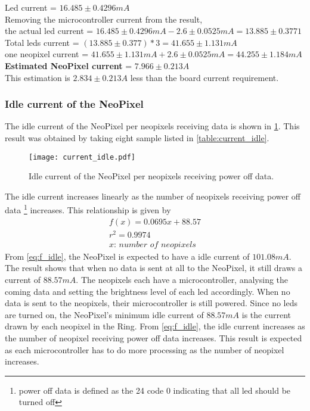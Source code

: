 {
	\centering
	Led current = $16.485 \pm 0.4296 mA$ \\
	Removing the microcontroller current from the result,\\ the actual led current = $16.485 \pm 0.4296 mA - 2.6 \pm 0.0525 mA = 13.885 \pm 0.3771$  \\
	Total leds current = $(13.885 \pm 0.377)*3 = 41.655 \pm 1.131 mA$  \\
	one neopixel current = $41.655 \pm 1.131 mA + 2.6 \pm 0.0525 mA  = 44.255 \pm 1.184 mA $\\
	\textbf{Estimated NeoPixel current} = $7.966 \pm 0.213 A$\\
}
This estimation is $2.834\pm0.213A$ less than the board current requirement.
  
\subsubsection{Idle current of the NeoPixel}\label{idle_current}
The idle current of the NeoPixel per neopixels receiving data is shown in \cref{fig:current_idle}. This result was obtained by taking eight sample listed in \cref{table:current_idle}. 
\begin{figure}[ht]
	\centering
	\texttt{[image: current\_idle.pdf]}
	\caption{Idle current of the NeoPixel per neopixels receiving power off data.}
	\label{fig:current_idle}
\end{figure}
The idle current increases linearly as the number of neopixels receiving power off data \footnote{power off data is defined as the 24 code 0 indicating that all led should be turned off} increases. This relationship is given by 
\begin{equation}
\label{eq:f_idle}
\begin{multlined}
f(x) = 0.0695x+88.57 \\
r^2 = 0.9974\\
\textit{$x$: number of neopixels}
\end{multlined}
\end{equation} 
From \cref{eq:f_idle}, the NeoPixel is expected to have a idle current of $101.08mA$. The result shows that when no data is sent at all to the NeoPixel, it still draws a current of $88.57mA$. The neopixels each have a microcontroller, analysing the coming data and setting the brightness level of each led accordingly. When no data is sent to the neopixels, their microcontroller is still powered. Since no leds are turned on, the NeoPixel's minimum idle current of $88.57mA$ is the current drawn by each neopixel in the Ring. From \cref{eq:f_idle}, the idle current increases as the number of neopixel receiving power off data increases. This result is expected as each microcontroller has to do more processing as the number of neopixel increases. 
  
